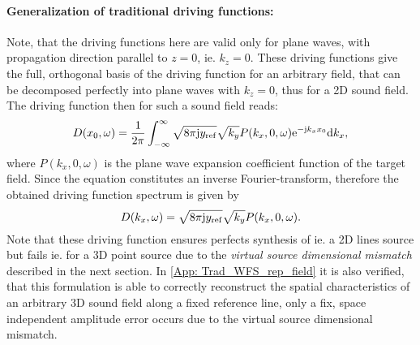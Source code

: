 \paragraph{Generalization of traditional driving functions:\\}
Note, that the driving functions here are valid only for plane waves, with propagation direction parallel to $z=0$, ie. $k_z=0$. These driving functions give the full, orthogonal basis of the driving function for an arbitrary field, that can be decomposed perfectly into plane waves with $k_z=0$, thus for a 2D sound field. The driving function then for such a sound field reads:
\begin{equation}
D(x_0,\omega) = \frac{1}{2\pi} \int_{-\infty}^{\infty} \sqrt{8\pi \mathrm{j} y_{\mathrm{ref}}}  \sqrt{k_y} P(k_x,0,\omega) \mathrm{e}^{-\mathrm{j}  k_x x_0} \mathrm{d} k_x, 
\end{equation} 
where $P(k_x,0,\omega)$ is the plane wave expansion coefficient function of the target field.
Since the equation constitutes an inverse Fourier-transform, therefore the obtained driving function spectrum is given by
\begin{equation}
D(k_x,\omega) = \sqrt{8\pi \mathrm{j} y_{\mathrm{ref}} } \sqrt{k_y} P(k_x,0,\omega).
\label{Eq:Theory:Trad_WFS_general}
\end{equation}
Note that these driving function ensures perfects synthesis of ie. a 2D lines source but fails ie. for a 3D point source due to the \emph{virtual source dimensional mismatch} described in the next section. In \ref{App: Trad_WFS_rep_field} it is also verified, that this formulation is able to correctly reconstruct the spatial characteristics of an arbitrary 3D sound field along a fixed reference line, only a fix, space independent amplitude error occurs due to the virtual source dimensional mismatch.


